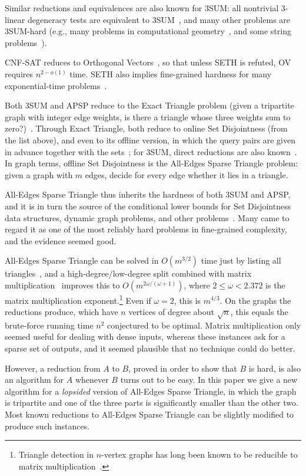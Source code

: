 Similar reductions and equivalences are also known for $3$SUM: all nontrivial 3-linear degeneracy tests are equivalent to $3$SUM~\cite{DGS20}, and many other problems are 3SUM-hard (e.g., many problems in computational geometry~\cite{GO95,BH01,SEO03,AH08}, and some string problems~\cite{ACLL14,AVWW14,KPP16}). 

CNF-SAT reduces to Orthogonal Vectors~\cite{Wil05}, so that unless SETH is refuted, OV requires $n^{2-o(1)}$ time. SETH also implies fine-grained hardness for many exponential-time problems~\cite{CDL+16}.

Both $3$SUM and APSP reduce to the Exact Triangle problem (given a tripartite graph with integer edge weights, is there a triangle whose three weights sum to zero?)~\cite{VW13,VW10,VW18}. Through Exact Triangle, both reduce to online Set Disjointness (from the list above), and even to its offline version, in which the query pairs are given in advance together with the sets~\cite{VX20a,CX24}; for $3$SUM, direct reductions are also known~\cite{Pat10,KPP16,JX23,ABF23}. In graph terms, offline Set Disjointness is the All-Edges Sparse Triangle problem: given a graph with $m$ edges, decide for every edge whether it lies in a triangle.

All-Edges Sparse Triangle thus inherits the hardness of both $3$SUM and APSP, and it is in turn the source of the conditional lower bounds for Set Disjointness data structures, dynamic graph problems, and other problems~\cite{Pat10,AV14,KPP16,GLP19}. Many came to regard it as one of the most reliably hard problems in fine-grained complexity, and the evidence seemed good. 


All-Edges Sparse Triangle can be solved in $O(m^{3/2})$ time just by listing all triangles~\cite{IR78,CN85}, and a high-degree/low-degree split combined with matrix multiplication~\cite{AYZ97} improves this to $O(m^{2\omega/(\omega+1)})$, where $2\le\omega<2.372$ is the matrix multiplication exponent.\footnote{Triangle detection in $n$-vertex graphs has long been known to be reducible to matrix multiplication~\cite{IR78}.} Even if $\omega=2$, this is $m^{4/3}$. On the graphs the reductions produce, which have $n$ vertices of degree about $\sqrt n$, this equals the brute-force running time $n^2$ conjectured to be optimal. Matrix multiplication only seemed useful for dealing with dense inputs, whereas these instances ask for a sparse set of outputs, and it seemed plausible that no technique could do better.

However, a reduction from $A$ to $B$, proved in order to show that $B$ is hard, is also an algorithm for $A$ whenever $B$ turns out to be easy. In this paper we give a new algorithm for a \emph{lopsided} version of All-Edges Sparse Triangle, in which the graph is tripartite and one of the three parts is significantly smaller than the other two. Most known reductions to All-Edges Sparse Triangle can be slightly modified to produce such instances.

